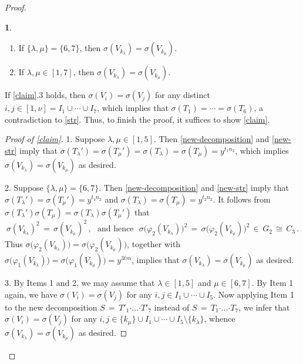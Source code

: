 \documentclass[leqno,a4paper]{amsart}
\def\bd{{\boldsymbol{\cdot}}}
\theoremstyle{plain}
\theoremstyle{definition}
\numberwithin{equation}{section}
\newtheorem{claim}{}[theorem]
\begin{document}
\begin{proof}
\begin{claim}
\begin{enumerate}
                \smallskip
				\item If $\{\lambda,\mu\}= \{6,7\}$, then $\sigma(V_{k_{\lambda}})=\sigma(V_{k_{\mu}})$.
				
                \smallskip
				\item If $\lambda,\mu\in [1,7]$, then $\sigma(V_{k_{\lambda}})=\sigma(V_{k_{\mu}})$.
			\end{enumerate}
		\end{claim}


		\smallskip
		If \ref{claim}.3 holds, then $\sigma(V_i)=\sigma(V_j)$ for any distinct $i,j\in [1,\nu]=I_1\cup\cdots\cup I_7$, which implies that $\sigma (T_1) = \cdots = \sigma (T_6)$, a contradiction to \eqref{str}. Thus, to finish the proof, it suffices to show \ref{claim}.
		

        \smallskip
		\begin{proof}[Proof of \ref{claim}]
			1. Suppose $\lambda,\mu\in [1,5]$. Then \eqref{new-decomposition} and \eqref{new-str} imply that $\sigma(T_{\lambda}')=\sigma(T_{\mu}')=\sigma(T_{\lambda})=\sigma(T_{\mu})=y^{t_1n_2}$, which implies $\sigma(V_{k_{\lambda}})=\sigma(V_{k_{\mu}})$ as desired.
			
			
			2. Suppose $\{\lambda,\mu\}= \{6,7\}$. Then \eqref{new-decomposition} and \eqref{new-str} imply that
			$\sigma(T_{\lambda}')=\sigma(T_{\mu}')=y^{t_4n_2}$ and $\sigma(T_{\lambda})=\sigma(T_{\mu})=y^{t_2n_2}$. It follows from $\sigma(T_{\lambda}')\sigma(T_{\mu})=\sigma(T_{\lambda})\sigma(T_{\mu}')$ that
		\[
		  \sigma(V_{k_{\lambda}})^{2} \, = \, \sigma(V_{k_{\mu}})^{2} \,, \,\, \text{ and hence } \,\, \sigma \big( \varphi_2(V_{k_{\lambda}}) \big)^{2} \, = \, \sigma \big( \varphi_2(V_{k_{\mu}}) \big)^{2} \, \in\,  G_2 \, \cong \, C_3 \,.
		\]
		Thus $\sigma \big( \varphi_2(V_{k_{\lambda}}) \big) = \sigma \big( \varphi_2(V_{k_{\mu}}) \big)$, together with $\sigma \big( \varphi_1(V_{k_{\lambda}}) \big) = \sigma \big( \varphi_1(V_{k_{\mu}}) \big) = y^{3tm}$, implies that $\sigma(V_{k_{\lambda}})=\sigma(V_{k_{\mu}})$ as desired.
		
		
		3. By Items 1 and 2, we may assume that $\lambda\in [1,5]$ and $\mu\in [6,7]$. By Item 1 again, we have $\sigma(V_i)=\sigma(V_j)$ for any $i,j\in I_1\cup\cdots\cup I_5$. Now applying Item 1 to  the new decomposition $S \, = \, T'_1 \bd \ldots \bd T'_7 $ instead of $S \, = \, T_1 \bd \ldots \bd T_7 $, we infer that $\sigma(V_i)=\sigma(V_j)$ for any $i,j\in \{k_{\mu}\}\cup I_1\cup\cdots\cup I_5\setminus \{k_{\lambda}\}$, whence $\sigma(V_{k_{\lambda}})=\sigma(V_{k_{\mu}})$ as desired.
		\qedhere[\ref{claim}]	
		\end{proof}
    \end{proof}
	
\end{document}
